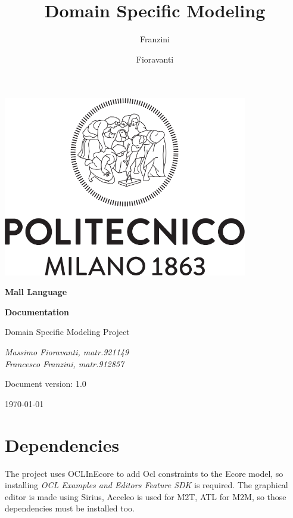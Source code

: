 \documentclass[a4paper]{article}
\author{Franzini \and Fioravanti}
\title{Domain Specific Modeling}
\begin{document}
	
\begin{titlepage}
	\centering
	\includegraphics[width=0.80\textwidth]{pictures/Logo_Politecnico_Milano}\par
	\vspace{1.5cm}
	{\LARGE \textbf {Mall Language} \par}
	\vspace{0.3cm}
	{\large \textbf{Documentation} \par}
	\vspace{1.5cm}
	{\Large{Domain Specific Modeling Project} \par}
	\vspace{1.5cm}
	{\Large\itshape Massimo Fioravanti, matr.921149 \\
				    Francesco Franzini, matr.912857 \\ }
	\vspace{2cm}
	\vfill
	{\large Document version: 1.0\par}
	{\large \today \par}
\end{titlepage}	
	
\maketitle
\tableofcontents
\clearpage

\section{Dependencies}
The project uses OCLInEcore to add Ocl constraints to the Ecore model, so installing \textit{OCL Examples and Editors Feature SDK} is required.
The graphical editor is made using Sirius, Acceleo is used for M2T, ATL for M2M, so those dependencies must be installed too.
\end{document}
